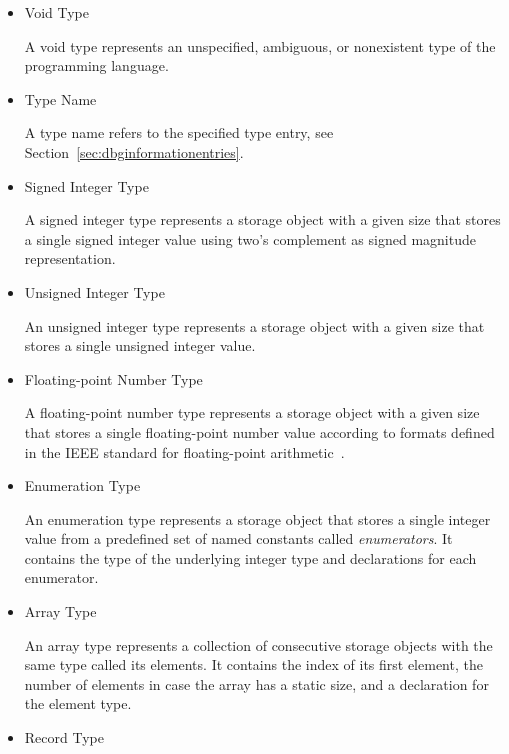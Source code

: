 \begin{itemize}

\item Void Type\alignright{}\nopagebreak

A void type represents an unspecified, ambiguous, or nonexistent type of the programming language.

\item Type Name\alignright{}\nopagebreak

A type name refers to the specified type entry, see Section~\ref{sec:dbginformationentries}.

\item Signed Integer Type\alignright{}\nopagebreak

A signed integer type represents a storage object with a given size that stores a single signed integer value using two's complement as signed magnitude representation.

\item Unsigned Integer Type\alignright{}\nopagebreak

An unsigned integer type represents a storage object with a given size that stores a single unsigned integer value.

\item Floating-point Number Type\alignright{}\nopagebreak

A floating-point number type represents a storage object with a given size that stores a single floating-point number value according to formats defined in the IEEE standard for floating-point arithmetic~\cite{ieee1985}.

\item Enumeration Type\alignright{}\nopagebreak

An enumeration type represents a storage object that stores a single integer value from a predefined set of named constants called \emph{enumerators}.
It contains the type of the underlying integer type and declarations for each enumerator.

\item Array Type\alignright{}\nopagebreak

An array type represents a collection of consecutive storage objects with the same type called its elements.
It contains the index of its first element, the number of elements in case the array has a static size, and a declaration for the element type.

\item Record Type\alignright{}\nopagebreak


\end{itemize}
